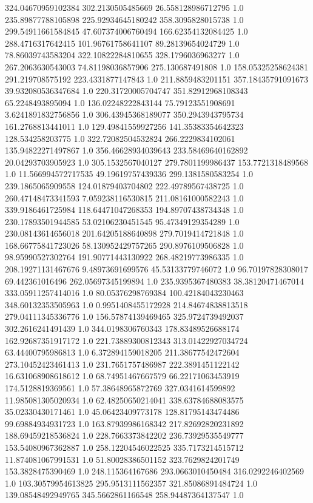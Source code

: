 324.04670959102384	302.2130505485669	26.558128986712795	1.0
235.89877788105898	225.92934645180242	358.3095828015738	1.0
299.54911661584845	47.607374006760494	166.62354132084425	1.0
288.4716317642415	101.96761758641107	89.28139654024729	1.0
78.86039743583204	322.10822284810655	328.1796036963277	1.0
267.2063630543003	74.81198036857906	275.130687491808	1.0
158.05325258624381	291.219708575192	223.4331877147843	1.0
211.8859483201151	357.18435791091673	39.932080536347684	1.0
220.31720005704747	351.82912968108343	65.2248493895094	1.0
136.02248222843144	75.79123551908691	3.6241891832756856	1.0
306.43945368189077	350.2943943795734	161.2768813441011	1.0
129.49841559927256	141.35383354642323	128.534258203775	1.0
322.72082504532824	266.2229834102061	135.94822271497867	1.0
356.46628934039643	233.58469640162892	20.04293703905923	1.0
305.1532567040127	279.7801199986437	153.7721318489568	1.0
11.566994572717535	49.19619757439336	299.1381580583254	1.0
239.1865065909558	124.01879403704802	222.49789567438725	1.0
260.47148473341593	7.059238116530815	211.08161000582243	1.0
339.9186461725984	118.64471047268353	194.89707438734348	1.0
230.17893501944585	53.02106230451545	95.47349129354289	1.0
230.08143614656018	201.64205188640898	279.7019414721848	1.0
168.66775841723026	58.130952429757265	290.8976109506828	1.0
98.95990527302764	191.90771443130922	268.48219773986335	1.0
208.19271131467676	9.48973691699576	45.53133779746072	1.0
96.70197828308017	69.442361016496	262.05697345199894	1.0
235.9395367480383	38.38120471467014	333.05911257414016	1.0
80.05376298769384	100.42184043230463	348.60132353505963	1.0
0.9951408455172928	214.84674838813518	279.04111345336776	1.0
156.57874139469465	325.9724739492037	302.2616241491439	1.0
344.0198306760343	178.83489526688174	162.92687351917172	1.0
221.73889300812343	313.01422927034724	63.44400795986813	1.0
6.372894159018205	211.38677542472604	273.10452423461413	1.0
231.7651757486987	222.3891451122142	16.631068908618612	1.0
68.74951467667579	66.22171063453919	174.5128819369561	1.0
57.38648965872769	327.0341614599892	11.985081305020934	1.0
62.48250650214041	338.63784688083575	35.02330430171461	1.0
45.06423409773178	128.81795143474486	99.69884934931723	1.0
163.87939986168342	217.82692820231892	188.69459218536824	1.0
228.7663373842202	236.73929535549777	153.54080967362887	1.0
258.12204546022525	335.7173214515712	11.874081067991531	1.0
51.80028386501152	323.7629824201749	153.3828475390469	1.0
248.115364167686	293.0663010450484	316.0292246402569	1.0
103.30579954613825	295.9513111562357	321.85086891484724	1.0
139.08548492949765	345.5662861166548	258.94487364137547	1.0
